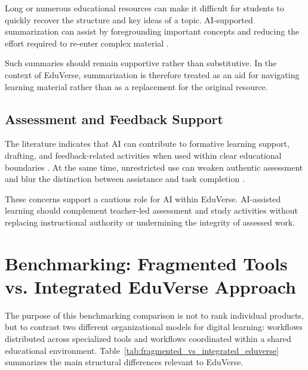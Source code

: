 Long or numerous educational resources can make it difficult for students to
quickly recover the structure and key ideas of a topic. AI-supported
summarization can assist by foregrounding important concepts and reducing the
effort required to re-enter complex material \cite{xie2025summarization}.

Such summaries should remain supportive rather than substitutive. In the
context of EduVerse, summarization is therefore treated as an aid for navigating
learning material rather than as a replacement for the original resource.

\subsection{Assessment and Feedback Support}
\label{subsec:assessment_and_feedback_support}

The literature indicates that AI can contribute to formative learning support,
drafting, and feedback-related activities when used within clear educational
boundaries \cite{labadze2023chatbots}. At the same time, unrestricted use can
weaken authentic assessment and blur the distinction between assistance and
task completion \cite{unesco2023genai,labadze2023chatbots}.

These concerns support a cautious role for AI within EduVerse. AI-assisted
learning should complement teacher-led assessment and study activities without
replacing instructional authority or undermining the integrity of assessed
work.

\section{Benchmarking: Fragmented Tools vs. Integrated EduVerse Approach}
\label{sec:benchmarking_fragmented_vs_integrated}

The purpose of this benchmarking comparison is not to rank individual products,
but to contrast two different organizational models for digital learning:
workflows distributed across specialized tools and workflows coordinated within
a shared educational environment.
Table~\ref{tab:fragmented_vs_integrated_eduverse} summarizes the main structural
differences relevant to EduVerse.

